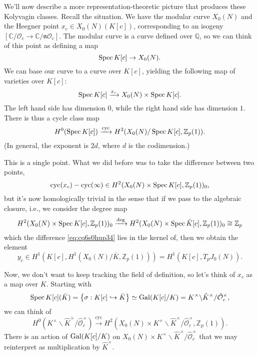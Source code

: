 \documentclass[reqno]{amsart} 
\numberwithin{theorem}{section}
\numberwithin{equation}{section}
\numberwithin{exercise}{section}
\begin{document}
We'll now describe a more representation-theoretic picture that produces these Kolyvagin classes.  Recall the situation.  We have the modular curve $X_0(N)$ and the Heegner point $x_c \in X_0(N)(K[c])$, corresponding to an isogeny $[\mathbb{C} / \mathcal{O}_c \rightarrow \mathbb{C} / \mathfrak{n} \mathcal{O}_c]$.  The modular curve is a curve defined over $\mathbb{Q}$, so we can think of this point as defining a map
\begin{equation*}
  \operatorname{Spec} K[c] \rightarrow X_0(N).
\end{equation*}
We can base our curve to a curve over $K[c]$, yielding the following map of varieties over $K [c]$:
\begin{equation*}
  \operatorname{Spec} K[c] \xrightarrow{x_c} X_0(N) \times \operatorname{Spec} K[c].
\end{equation*}
The left hand side has dimension $0$, while the right hand side has dimension $1$.  There is thus a cycle class map
\begin{equation*}
  H^0(\operatorname{Spec} K[c])
  \xrightarrow{\mathrm{cyc}}
  H^{2}(X_0(N) / \operatorname{Spec} K[c], \mathbb{Z}_p(1)).
\end{equation*}
(In general, the exponent is $2 d$, where $d$ is the codimension.)

This is a single point.  What we did before was to take the difference between two points,
\begin{equation}\label{eq:cq6s0hup34}
  \operatorname{cyc}(x_c) - \operatorname{cyc}(\infty) \in
  H^2(X_0(N) \times \operatorname{Spec} K[c], \mathbb{Z}_p(1))_0,
\end{equation}
but it's now homologically trivial in the sense that if we pass to the algebraic closure, i.e., we consider the degree map
\begin{equation*}
  H^2(X_0(N) \times \operatorname{Spec} K[c], \mathbb{Z}_p(1))_0
  \xrightarrow{\deg}
  H^2(X_0(N) \times \operatorname{Spec} \bar{K}[c], \mathbb{Z}_p(1))_0
  \cong \mathbb{Z}_p
\end{equation*}
which the difference \eqref{eq:cq6s0hup34} lies in the kernel of, then we obtain the element
\begin{equation*}
  y_c \in
  H^1(K[c], H^1(X_0(N) / \bar{K}, \mathbb{Z}_p(1)))
  =H^1(K[c], T_p J_0(N)).
\end{equation*}

Now, we don't want to keep tracking the field of definition, so let's think of $x_c$ as a map over $K$.  Starting with
\begin{equation*}
  \operatorname{Spec} K[c](\bar{K})
  = \left\{ \sigma : K[c] \hookrightarrow \bar{K} \right\} \simeq \operatorname{Gal}(K[c] / K)
  = K^\times \backslash \hat{K}^\times / \hat{\mathcal{O}}_c^\times,
\end{equation*}
we can think of
\begin{equation*}
  H^0(K^\times \backslash \hat{K}^\times / \hat{\mathcal{O}}_c^\times)
  \xrightarrow{\mathrm{cyc}}
  H^2(X_0(N) \times K^\times \backslash \hat{K}^\times / \hat{\mathcal{O}}_c^\times,
  \mathbb{Z}_p(1)).
\end{equation*}
There is an action of $\operatorname{Gal}(K[c] / K)$ on $X_0(N) \times K^\times \backslash \hat{K}^\times / \hat{\mathcal{O}}_c^\times$ that we may reinterpret as multiplication by $\hat{K}^\times$.
\end{document}
